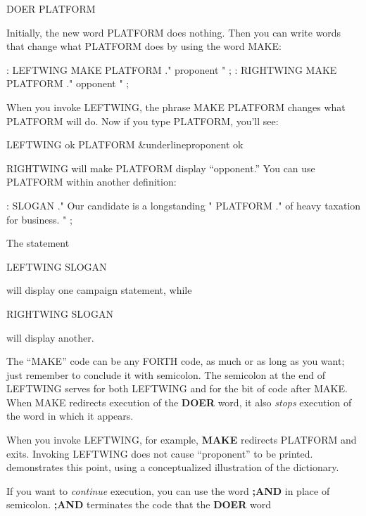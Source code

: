 \begin{Code}
DOER PLATFORM
\end{Code}
Initially, the new word PLATFORM does nothing. Then you can write
words that change what PLATFORM does by using the word MAKE:

\begin{Code}
: LEFTWING   MAKE PLATFORM  ." proponent " ;
: RIGHTWING  MAKE PLATFORM  ." opponent " ;
\end{Code}
When you invoke LEFTWING, the phrase MAKE PLATFORM changes
what PLATFORM will do. Now if you type PLATFORM, you'll see:

\begin{Code}[commandchars=\&\{\}]
LEFTWING ok
PLATFORM &underline{proponent ok}
\end{Code}
RIGHTWING will make PLATFORM display ``opponent.'' You can use
PLATFORM within another definition:

\begin{Code}
: SLOGAN   ." Our candidate is a longstanding " PLATFORM
   ." of heavy taxation for business. " ;
\end{Code}
The statement

\begin{Code}
LEFTWING SLOGAN
\end{Code}
will display one campaign statement, while

\begin{Code}
RIGHTWING SLOGAN
\end{Code}
will display another.

The ``MAKE'' code can be any FORTH code, as much or as long as
you want; just remember to conclude it with semicolon. The semicolon at
the end of LEFTWING serves for both LEFTWING and for the bit of
code after MAKE. When MAKE redirects execution of the \textbf{DOER} word,
it also \emph{stops} execution of the word in which it appears.

When you invoke LEFTWING, for example, \textbf{MAKE} redirects
PLATFORM and exits. Invoking LEFTWING does not cause ``proponent''
to be printed.  demonstrates this point, using a
conceptualized illustration of the dictionary.

If you want to \emph{continue} execution, you can use the word \textbf{;AND} in
place of semicolon. \textbf{;AND} terminates the code that the \textbf{DOER} word


